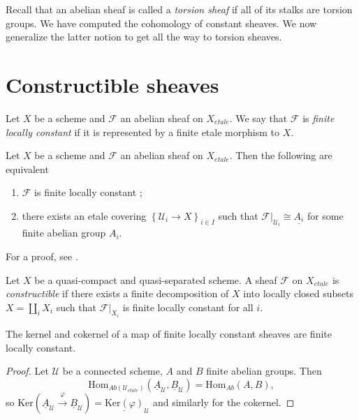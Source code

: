 \noindent
Recall that an abelian sheaf is called a {\it torsion sheaf} if all of its
stalks are torsion groups. We have computed the cohomology of constant sheaves.
We now generalize the latter notion to get all the way to torsion sheaves.




\section{Constructible sheaves}

\begin{definition}
\label{definition-finite-locally-constant}
Let $X$ be a scheme and $\mathcal{F}$ an abelian sheaf on $X_{etale}$. We say 
that
$\mathcal{F}$ is {\it finite locally constant} if it is represented by a
finite etale morphism to $X$.
\end{definition}

\begin{lemma}
\label{lemma-characterize-finite-locally-constant}
Let $X$ be a scheme and $\mathcal{F}$ an abelian sheaf on $X_{etale}$. Then the
following are equivalent
\begin{enumerate}
\item
$\mathcal{F}$ is finite locally constant ;
\item
there exists an etale covering $\left\{ \mathcal{U}_i \to X\right\}_{i\in I}$
such that $\mathcal{F}|_{\mathcal{U}_i} \cong \underline{A_i}$ for some finite
abelian group $A_i$.
\end{enumerate}
\end{lemma}

\noindent
For a proof, see \cite{SGA4.5}.

\begin{definition}
\label{definition-constructible}
Let $X$ be a quasi-compact and quasi-separated scheme. A sheaf $\mathcal{F}$ on
$X_{etale}$ is {\it constructible} if there exists a finite decomposition of $X$
into locally closed subsets $X=\coprod_i X_i$ such that $\mathcal{F}|_{X_i}$ is
finite locally constant for all $i$.
\end{definition}

\begin{lemma}
\label{lemma-kernel-finite-locally-constant}
The kernel and cokernel of a map of finite locally constant sheaves are finite
locally constant.
\end{lemma}

\begin{proof}
Let $\mathcal{U}$ be a connected scheme, $A$ and $B$ finite abelian groups.
Then
$$
\text{Hom}_{\textit{Ab}(\mathcal{U}_{etale})} \left(\underline A_\mathcal{U},
\underline B_\mathcal{U}\right) = \text{Hom}_{\textit{Ab}}(A, B),
$$
so $\text{Ker}\left(\underline A_\mathcal{U} \xrightarrow{\varphi} \underline
B_\mathcal{U}\right) = \underline{\text{Ker}(\varphi)}_\mathcal{U}$ and
similarly for the cokernel.
\end{proof}

